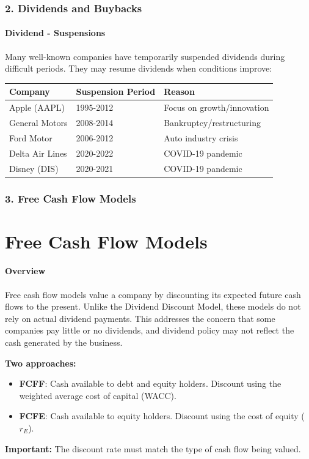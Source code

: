 \documentclass{beamer}
\begin{document}
\begin{frame}[t]
    \frametitle{2. Dividends and Buybacks}
    \framesubtitle{Dividend - Suspensions}

    Many well-known companies have temporarily suspended dividends during difficult periods. 
    They may resume dividends when conditions improve:

    \begin{table}
        \centering
        \begin{tabular}{|l|l|l|}
        \hline
        \textbf{Company} & \textbf{Suspension Period} & \textbf{Reason} \\
        \hline
        Apple (AAPL) & 1995-2012 & Focus on growth/innovation \\
        \hline
        General Motors & 2008-2014 & Bankruptcy/restructuring \\
        \hline
        Ford Motor & 2006-2012 & Auto industry crisis \\
        \hline
        Delta Air Lines & 2020-2022 & COVID-19 pandemic \\
        \hline
        Disney (DIS) & 2020-2021 & COVID-19 pandemic \\
        \hline
        \end{tabular}
    \end{table}

\end{frame}



\begin{frame}[t]
    \frametitle{3. Free Cash Flow Models}
    \section{Free Cash Flow Models}
    \framesubtitle{Overview}

    Free cash flow models value a company by discounting its
    expected future cash flows to the present.  Unlike the Dividend Discount Model, these models do not rely on actual dividend payments. This addresses the concern that some companies pay little or no dividends, and dividend policy may not reflect the cash
    generated by the business.

    \vspace{1em}

    \textbf{Two approaches:}
    \begin{itemize}
        \item \textbf{FCFF}: Cash available to debt and equity holders.
        Discount using the weighted average cost of capital (WACC).
        \item \textbf{FCFE}: Cash available to equity holders.
        Discount using the cost of equity ($r_E$).
    \end{itemize}

    \vspace{1em}

    \textbf{Important:} The discount rate must match the type
    of cash flow being valued.

\end{frame}
\end{document}
